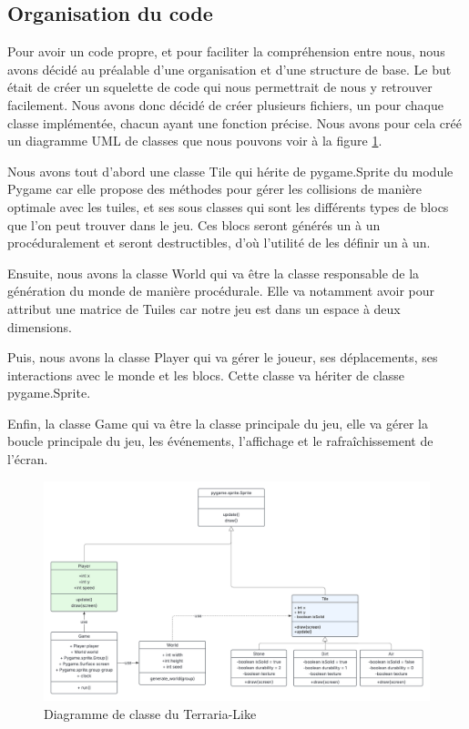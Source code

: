 \documentclass{article}
\begin{document}
\subsection{Organisation du code}

Pour avoir un code propre, et pour faciliter la compréhension entre nous, nous avons décidé au préalable d'une organisation et d'une structure de base. Le but était de créer un squelette de code qui nous permettrait de nous y retrouver facilement. Nous avons donc décidé de créer plusieurs fichiers, un pour chaque classe implémentée, chacun ayant une fonction précise. Nous avons pour cela créé un diagramme UML de classes que nous pouvons voir à la figure \ref{UML_class}.\par
Nous avons tout d'abord une classe Tile qui hérite de pygame.Sprite du module Pygame car elle propose des méthodes pour gérer les collisions de manière optimale avec les tuiles, et ses sous classes qui sont les différents types de blocs que l'on peut trouver dans le jeu. Ces blocs seront générés un à un procéduralement et seront destructibles, d'où l'utilité de les définir un à un.\par
Ensuite, nous avons la classe World qui va être la classe responsable de la génération du monde de manière procédurale. Elle va notamment avoir pour attribut une matrice de Tuiles car notre jeu est dans un espace à deux dimensions.\par
Puis, nous avons la classe Player qui va gérer le joueur, ses déplacements, ses interactions avec le monde et les blocs. Cette classe va hériter de classe pygame.Sprite.\par
Enfin, la classe Game qui va être la classe principale du jeu, elle va gérer la boucle principale du jeu, les événements, l'affichage et le rafraîchissement de l'écran.\par

\begin{figure}[!h]
  \centering
  \includegraphics[width=\textwidth]{assets/UML_class.png}
  \caption{Diagramme de classe du Terraria-Like}
  \label{UML_class}
\end{figure}
\end{document}
